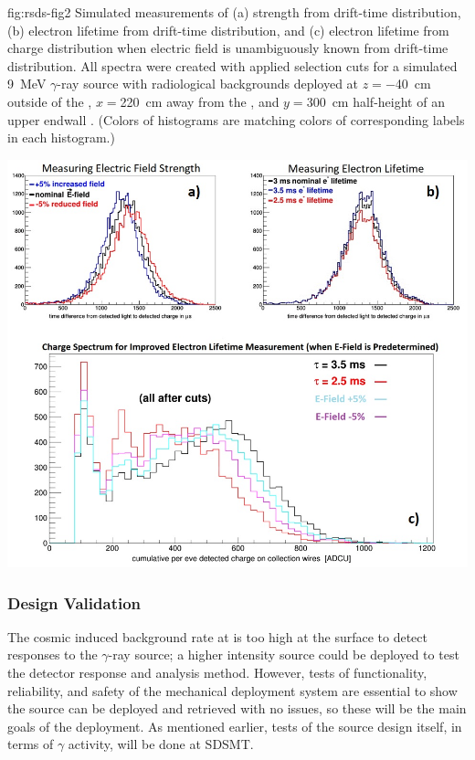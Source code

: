 \begin{dunefigure}
{fig:rsds-fig2}
{Simulated measurements of (a) \efield strength from drift-time distribution, (b) electron lifetime from drift-time distribution, and (c) electron lifetime from charge distribution when electric field is unambiguously known from drift-time distribution. All spectra were created with applied selection cuts for a simulated \SI{9}{\MeV} $\gamma$-ray source with radiological backgrounds deployed at $z=$\SI{-40}{\cm} outside of the , $x=$\SI{220}{\cm} away from the , and $y=$\SI{300}{\cm} half-height of an upper endwall . (Colors of histograms are matching colors of corresponding labels in each histogram.)}
\centering
  
\includegraphics[width=0.9\linewidth]{graphics/9MeVgamma_withBG_EfieldDriftTimes_eLifetime_chargeSpectrum_cut_nicer2.jpg}    
    
\end{dunefigure}




\subsubsection{ Design Validation}
The cosmic induced background rate at  is too high at the surface to detect responses to the  $\gamma$-ray source; a higher intensity source could be deployed to test the detector response and analysis method. However, tests of functionality,  reliability, and safety of the mechanical deployment system are essential to show the source can be deployed and retrieved with no issues, so these will be the main goals of the  deployment. As mentioned earlier, tests of the source design itself, in terms of $\gamma$ activity, will be done at SDSMT. 

